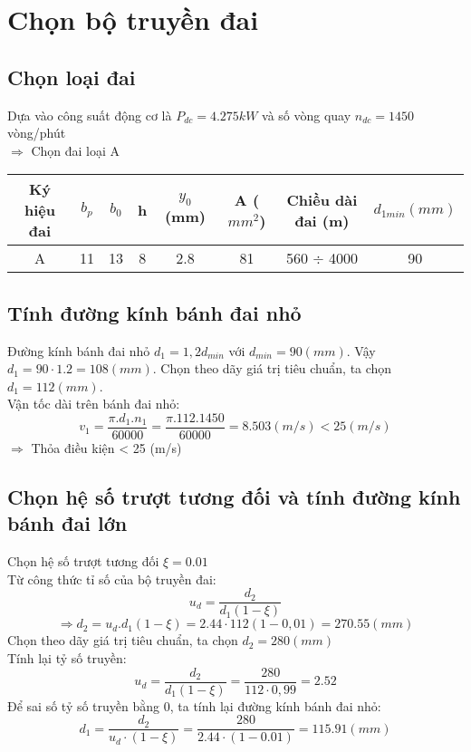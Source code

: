 \section{Chọn bộ truyền đai}
\subsection{Chọn loại đai}
Dựa vào công suất động cơ là $P_{dc} = 4.275 kW$ và số vòng quay $n_{dc} = 1450$ vòng/phút \\
$\Rightarrow$ Chọn đai loại A \\    

\begin{tabular}{|c|c|c|c|c|c|c|c|}
    \hline 
    Ký hiệu đai & $b_p$  & $b_0$  & h  & $y_0$ (mm) & A ($mm^2$) & Chiều dài đai (m) & $d_{1min} (mm)$ \\ \hline
    A & 11 & 13 & 8 & 2.8 & 81 & 560 $\div$ 4000 & 90 \\ \hline
\end{tabular}
\subsection{Tính đường kính bánh đai nhỏ}
Đường kính bánh đai nhỏ $d_1 = 1,2d_{min}$ với $d_{min} = 90 (mm)$. Vậy $d_1 = 90 \cdot 1.2=108(mm)$.
Chọn theo dãy giá trị tiêu chuẩn, ta chọn $d_1 = 112 (mm)$.\\
Vận tốc dài trên bánh đai nhỏ:\\
\[
    v_1 = \frac{\pi.d_1.n_1}{60000} = \frac{\pi.112.1450}{60000} = 8.503 (m/s) < 25 (m/s)
\]  
$\Rightarrow$ Thỏa điều kiện < 25 (m/s) \\
\subsection{Chọn hệ số trượt tương đối và tính đường kính bánh đai lớn}
Chọn hệ số trượt tương đối $\xi = 0.01$ \\
Từ công thức tỉ số của bộ truyền đai: \\
\[
    u_d = \frac{d_2}{d_1(1 - \xi)}
\]
\[
    \Rightarrow d_2 = u_d.d_1(1 - \xi) = 2.44 \cdot 112(1 - 0,01) = 270.55 (mm)
\]
Chọn theo dãy giá trị tiêu chuẩn, ta chọn $d_2 = 280 (mm)$ \\
Tính lại tỷ số truyền: \\
\[
    u_d = \frac{d_2}{d_1(1 - \xi)} = \frac{280}{112 \cdot 0,99} = 2.52
\]
Để sai số tỷ số truyền bằng 0, ta tính lại đường kính bánh đai nhỏ: \\
\[
    d_1 = \frac{d_2}{u_d \cdot (1- \xi)} = \frac{280}{2.44 \cdot (1-0.01)} = 115.91 (mm)
\]
